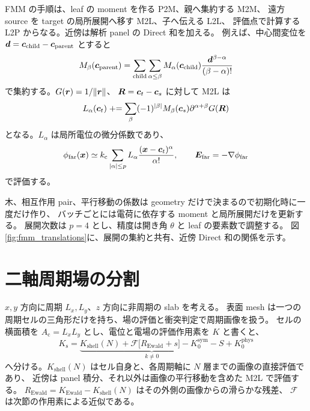 FMM の手順は、leaf の moment を作る P2M、親へ集約する M2M、
遠方 source を target の局所展開へ移す M2L、子へ伝える L2L、
評価点で計算する L2P からなる。近傍は解析 panel の Direct 和を加える。
例えば、中心間変位を $\bm{d}=\bm{c}_{\mathrm{child}}-\bm{c}_{\mathrm{parent}}$ とすると
\begin{equation}
 M_\beta(\bm{c}_{\mathrm{parent}})
 =\sum_{\mathrm{child}}\sum_{\alpha\le\beta}
 M_\alpha(\bm{c}_{\mathrm{child}})
 \frac{\bm{d}^{\beta-\alpha}}{(\beta-\alpha)!}
\end{equation}
で集約する。$G(\bm{r})=1/\lVert\bm{r}\rVert$、
$\bm{R}=\bm{c}_t-\bm{c}_s$ に対して M2L は
\begin{equation}
 L_\alpha(\bm{c}_t)\mathrel{+}=
 \sum_\beta(-1)^{|\beta|}M_\beta(\bm{c}_s)
 \partial^{\alpha+\beta}G(\bm{R})
\end{equation}
となる。$L_\alpha$ は局所電位の微分係数であり、
\begin{equation}
 \phi_{\mathrm{far}}(\bm{x})\simeq
 k_{\mathrm c}\sum_{|\alpha|\le p}L_\alpha
 \frac{(\bm{x}-\bm{c}_t)^\alpha}{\alpha!},\qquad
 \bm{E}_{\mathrm{far}}=-\nabla\phi_{\mathrm{far}}
\end{equation}
で評価する。

木、相互作用 pair、平行移動の係数は geometry だけで決まるので初期化時に一度だけ作り、
バッチごとには電荷に依存する moment と局所展開だけを更新する。
展開次数は $p=4$ とし、精度は開き角 $\theta$ と leaf の要素数で調整する。
図\ref{fig:fmm_translations}に、展開の集約と共有、近傍 Direct 和の関係を示す。


\section{二軸周期場の分割}
$x,y$ 方向に周期 $L_x,L_y$、$z$ 方向に非周期の slab を考える。
表面 mesh は一つの周期セルの三角形だけを持ち、場の評価と衝突判定で周期画像を扱う。
セルの横面積を $A_{\mathrm c}=L_xL_y$ とし、電位と電場の評価作用素を $K$ と書くと、
\begin{equation}
 K_{\mathrm s}=
 \underbrace{K_{\mathrm{shell}}(N)
   +\mathcal F\bigl[R_{\mathrm{Ewald}}+s\bigr]-K_0^{\mathrm{sym}}-S}_{k\ne0}
 +K_0^{\mathrm{phys}}
 \label{eq:periodic_split}
\end{equation}
へ分ける。$K_{\mathrm{shell}}(N)$ はセル自身と、各周期軸に $N$ 層までの画像の直接評価であり、
近傍は panel 積分、それ以外は画像の平行移動を含めた M2L で評価する。
$R_{\mathrm{Ewald}}=K_{\mathrm{Ewald}}-K_{\mathrm{shell}}(N)$ はその外側の画像からの滑らかな残差、
$\mathcal F$ は次節の作用素による近似である。

